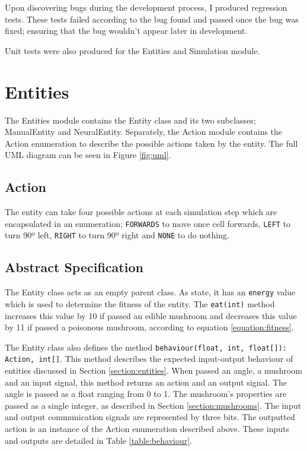 \documentclass[12pt,a4paper,twoside,openright]{report}
\begin{document}
Upon discovering bugs during the development process, I produced regression tests. These tests failed according to the bug found and passed once the bug was fixed; ensuring that the bug wouldn't appear later in development.

Unit tests were also produced for the Entities and Simulation module.

\section{Entities}

The Entities module contains the Entity class and its two subclasses; ManualEntity and NeuralEntity. Separately, the Action module contains the Action enumeration to describe the possible actions taken by the entity. The full UML diagram can be seen in Figure \ref{fig:uml}.

\subsection{Action}

The entity can take four possible actions at each simulation step which are encapsulated in an enumeration; \texttt{FORWARDS} to move once cell forwards, \texttt{LEFT} to turn 90º left, \texttt{RIGHT} to turn 90º right and \texttt{NONE} to do nothing.

\subsection{Abstract Specification}

The Entity class acts as an empty parent class. As state, it has an \texttt{energy} value which is used to determine the fitness of the entity. The \texttt{eat(int)} method increases this value by 10 if passed an edible mushroom and decreases this value by 11 if passed a poisonous mushroom, according to equation \ref{equation:fitness}. 

The Entity class also defines the method \texttt{behaviour(float, int, float[]): Action, int[]}. This method describes the expected input-output behaviour of entities discussed in Section \ref{section:entities}. When passed an angle, a mushroom and an input signal, this method returns an action and an output signal. The angle is passed as a float ranging from 0 to 1. The mushroom's properties are passed as a single integer, as described in Section \ref{section:mushrooms}. The input and output communication signals are represented by three bits. The outputted action is an instance of the Action enumeration described above. These inputs and outputs are detailed in Table \ref{table:behaviour}. 
\end{document}

